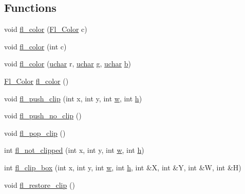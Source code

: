 \subsection*{Functions}
\begin{DoxyCompactItemize}
\item 
void \hyperlink{group__fl__attributes_ga974e9f64959aa83cf6f0a36d3f0105aa}{fl\+\_\+color} (\hyperlink{_enumerations_8_h_a8b762953646f8abee866061f1af78a6a}{Fl\+\_\+\+Color} c)
\item 
void \hyperlink{group__fl__attributes_ga40be3354c55ced3fb119e063cd832716}{fl\+\_\+color} (int c)
\item 
void \hyperlink{group__fl__attributes_ga208595f1c4e4bd0c32ee5a56194b405c}{fl\+\_\+color} (\hyperlink{fl__types_8h_a65f85814a8290f9797005d3b28e7e5fc}{uchar} r, \hyperlink{fl__types_8h_a65f85814a8290f9797005d3b28e7e5fc}{uchar} g, \hyperlink{fl__types_8h_a65f85814a8290f9797005d3b28e7e5fc}{uchar} \hyperlink{forms_8_h_a0ba06a290a384fa06b1b90745827dae2}{b})
\item 
\hyperlink{_enumerations_8_h_a8b762953646f8abee866061f1af78a6a}{Fl\+\_\+\+Color} \hyperlink{group__fl__attributes_gaea8392e995de663b0d8063af199cf085}{fl\+\_\+color} ()
\item 
void \hyperlink{group__fl__drawings_gabe60242ba3b975800717b95cb6bc06d2}{fl\+\_\+push\+\_\+clip} (int x, int y, int \hyperlink{forms_8_h_aac374e320caaadeca4874add33b62af2}{w}, int \hyperlink{forms_8_h_a7e427ba5b307f9068129699250690066}{h})
\item 
void \hyperlink{group__fl__drawings_ga0fce6c81d69c3a80c8073a338f1346fd}{fl\+\_\+push\+\_\+no\+\_\+clip} ()
\item 
void \hyperlink{group__fl__drawings_ga7abb216a9a87408c8926126cc9efce22}{fl\+\_\+pop\+\_\+clip} ()
\item 
int \hyperlink{group__fl__drawings_ga2bd899d466196ffc26cc61542ee10539}{fl\+\_\+not\+\_\+clipped} (int x, int y, int \hyperlink{forms_8_h_aac374e320caaadeca4874add33b62af2}{w}, int \hyperlink{forms_8_h_a7e427ba5b307f9068129699250690066}{h})
\item 
int \hyperlink{group__fl__drawings_ga6ec7356beb51a8f1d2b987f4d00f42d8}{fl\+\_\+clip\+\_\+box} (int x, int y, int \hyperlink{forms_8_h_aac374e320caaadeca4874add33b62af2}{w}, int \hyperlink{forms_8_h_a7e427ba5b307f9068129699250690066}{h}, int \&X, int \&Y, int \&W, int \&H)
\item 
void \hyperlink{group__fl__drawings_gaf98789ec460134ffc81f2af2d2db6857}{fl\+\_\+restore\+\_\+clip} ()
\item 

\end{DoxyCompactItemize}

